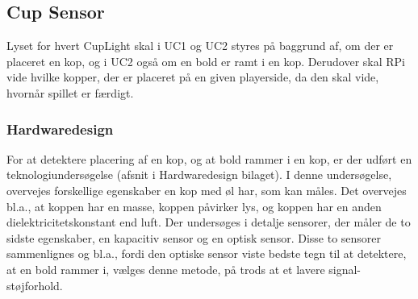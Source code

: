 \documentclass[Rapport/Rapport_main.tex]{subfiles}
\begin{document}
\subsection{Cup Sensor}
Lyset for hvert CupLight skal i UC1 og UC2 styres på baggrund af, om der er placeret en kop, og i UC2 også om en bold er ramt i en kop. Derudover skal RPi vide hvilke kopper, der er placeret på en given playerside, da den skal vide, hvornår spillet er færdigt.
\subsubsection{Hardwaredesign}
For at detektere placering af en kop, og at bold rammer i en kop, er der udført en teknologiundersøgelse (afsnit  i Hardwaredesign bilaget). I denne undersøgelse, overvejes forskellige egenskaber en kop med øl har, som kan måles. Det overvejes bl.a., at koppen har en masse, koppen påvirker lys, og koppen har en anden dielektricitetskonstant end luft. Der undersøges i detalje sensorer, der måler de to sidste egenskaber, en kapacitiv sensor og en optisk sensor. Disse to sensorer sammenlignes og bl.a., fordi den optiske sensor viste bedste tegn til at detektere, at en bold rammer i, vælges denne metode, på trods at et lavere signal-støjforhold.
\end{document}
